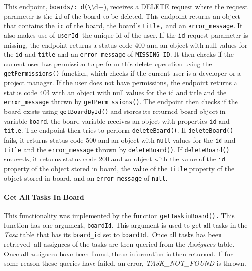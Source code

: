 \documentclass{article}
\def\code#1{\texttt{#1}}
\begin{document}
This endpoint, \code{boards/:id(\textbackslash}{\textbackslash{}d+)}, receives a
DELETE request where the request parameter is the \code{id} of the board to be
deleted. This endpoint returns an object that contains the \code{id} of the
board, the board’s \code{title,} and an \code{error\_message}. It also makes use
of \code{userId}, the unique id of the user. If the \code{id} request parameter
is missing, the endpoint returns a status code 400 and an object with null
values for the \code{id} and \code{title} and an \code{error\_message} of
\code{MISSING\_ID}. It then checks if the current user has permission to perform
this delete operation using the \code{getPermissions()} function, which checks
if the current user is a developer or a project manager. If the user does not
have permissions, the endpoint returns a status code 403 with an object with
null values for the id and title and the \code{error\_message} thrown by
\code{getPermissions()}. The endpoint then checks if the board exists using
\code{getBoardById()} and stores its returned board object in variable
\code{board}. the board variable receives an object with properties \code{id}
and \code{title}. The endpoint then tries to perform \code{deleteBoard()}. If
\code{deleteBoard()} fails, it returns status code 500 and an object with
\code{null} values for the \code{id} and \code{title} and the
\code{error\_message} thrown by \code{deleteBoard()}. If \code{deleteBoard()}
succeeds, it returns status code 200 and an object with the value of the
\code{id} property of the object stored in board, the value of the \code{title}
property of the object stored in board, and an \code{error\_message} of \code{null}.

\paragraph{Get All Tasks In Board}
This functionality was implemented by the function \code{getTaskinBoard().} This
function has one argument, \code{boardId}. This argument is used to get all
tasks in the \emph{Task} table that has its \code{board\_id} set to
\code{boardId.} Once all tasks has been retrieved, all assignees of the tasks
are then queried from the \emph{Assignees} table. Once all assignees have been
found, these information is then returned. If for some reason these queries have
failed, an error, \emph{TASK\_NOT\_FOUND} is thrown.
\end{document}
